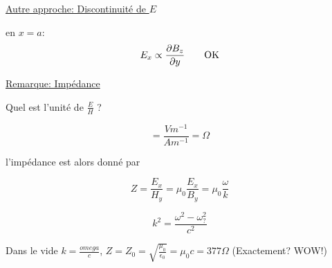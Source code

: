 \underline{Autre approche: Discontinuité de $E$ } 

en $x=a$: $$E_{x} \propto \pdv{B_z}{y} \qquad \text{OK}$$ 

\underline{Remarque: Impédance} 

Quel est l'unité de $\frac{E}{H}$ ? 

$$= \frac{Vm^{-1}}{Am^{-1}} = \Omega$$ 

l'impédance est alors donné par

$$Z = \frac{E_{x}}{H_y} = \mu_{0} \frac{E_{x}}{B_y}= \mu_{0} \frac \omega k$$ 

$$k^2 = \frac{\omega^2-\omega_{?}^2}{c^2} $$ 

Dans le vide $k = \frac{omega}{c} $,  $Z = Z_{0} =\sqrt{\frac{\mu_{0}}{\epsilon_0} }= \mu_{0} c = 377\Omega$ (Exactement? WOW!) 




